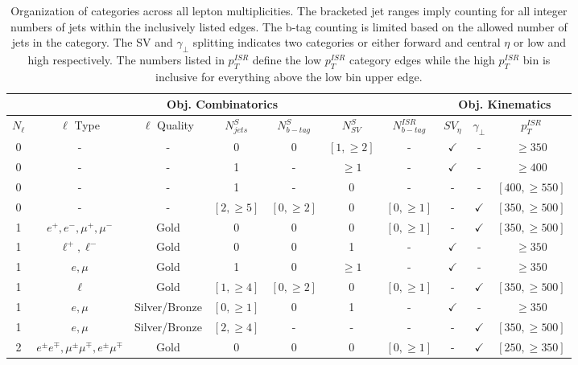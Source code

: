 \begin{table}
\caption{Organization of categories across all lepton multiplicities. The bracketed jet ranges imply counting for all integer numbers of jets within the inclusively listed edges. The b-tag counting is limited based on the allowed number of jets in the category. The SV and $\gamma_\perp$ splitting indicates two categories or either forward and central $\eta$ or low and high respectively. The numbers listed in $p_T^{ISR}$ define the low $p_T^{ISR}$ category edges while the high $p_T^{ISR}$ bin is inclusive for everything above the low bin upper edge.}
\begin{adjustwidth}{-0.7in}{-1in}

\begin{tabular}{|c|c|c|c|c|c|c|c|c|c|}
\multicolumn{7}{c|}{Obj. Combinatorics} & \multicolumn{3}{c}{Obj. Kinematics} \\
\hline 
$N_\ell$ &  $\ell$ Type & $\ell$ Quality & $N_{jets}^{S}$ & $N_{b-tag}^{S}$ & $N_{SV}^S$ & $N_{b-tag}^{ISR}$ & $SV_\eta$ & $\gamma_\perp$ & $p_T^{ISR}$ \\ 
\hline
\hline 
0 & - & - & 0 & 0 & $[1,\geq 2]$ & - & $\checkmark$ & - & $\geq 350$ \\ 
0 & - & - & 1 & - & $\geq 1$ &    - & $\checkmark$ & - & $\geq 400$ \\
0 & - & - & 1 & - &  0       &    - &  -           & - & $[400,\geq 550]$ \\
0 & - & - & $[2,\geq 5]$ & $[0,\geq 2]$ & 0 & $[0,\geq 1]$ & - & $\checkmark$ & $[350,\geq500]$ \\
\hline 
1 & $e^+,e^-,\mu^+,\mu^-$& Gold & 0 & 0 & 0 & $[0,\geq 1]$ & - & $\checkmark$ & $[350, \geq 500]$ \\
1 & $\ell^+, \ell^-$  & Gold & 0 & 0 & 1 & - & $\checkmark$ & - & $\geq 350$ \\
1 & $e, \mu$ & Gold & 1 & 0 &  $\geq 1$ & - & $\checkmark$ & - & $\geq 350$ \\
1 & $\ell$ & Gold & $[1,\geq 4]$ & $[0,\geq 2]$ & 0 & $[0,\geq 1]$ & - & $\checkmark$ & $[350, \geq 500]$ \\
1 & $e, \mu$ & Silver/Bronze & $[0,\geq 1]$ & 0 & 1 & - & $\checkmark$ & - & $\geq 350$ \\
1 & $e, \mu$ & Silver/Bronze & $[2, \geq 4]$ & - & - & - & - & $\checkmark$ & $[350, \geq 500]$ \\
\hline
2 & $e^\pm e^\mp, \mu^\pm \mu^\mp, e^\pm \mu^\mp $ & Gold & 0 & 0 & 0 & $[0,\geq 1]$ & - & $\checkmark$ & $[250,\geq350]$  \\

\end{tabular}
\end{adjustwidth}
\end{table}
